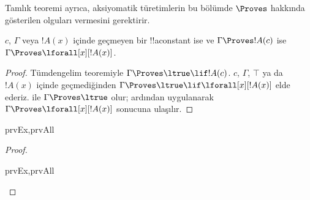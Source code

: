 



\begin{explain}
  Tamlık teoremi ayrıca, aksiyomatik türetimlerin bu bölümde $\Proves$
  hakkında gösterilen olguları vermesini gerektirir.
\end{explain}

\begin{thm}
 $c$, $\Gamma$ veya $!A(x)$ içinde
geçmeyen bir !!a{constant} ise ve $\Gamma \Proves !A(c)$ ise
$\Gamma \Proves \lforall[x][!A(x)]$.
\end{thm}

\begin{proof}
Tümdengelim teoremiyle $\Gamma \Proves \ltrue \lif !A(c)$. $c$, $\Gamma$,
$\top$ ya da~$!A(x)$ içinde geçmediğinden $\Gamma \Proves
\ltrue \lif \lforall[x][!A(x)]$ elde ederiz.  ile
$\Gamma \Proves \ltrue$ olur; ardından  uygulanarak
$\Gamma \Proves \lforall[x][!A(x)]$ sonucuna ulaşılır.
\end{proof}

\begin{prop}
\begin{tagenumerate}{prvEx,prvAll}

\end{tagenumerate}
\end{prop}

\begin{proof}
\begin{tagenumerate}{prvEx,prvAll}
\end{tagenumerate}
\end{proof}

